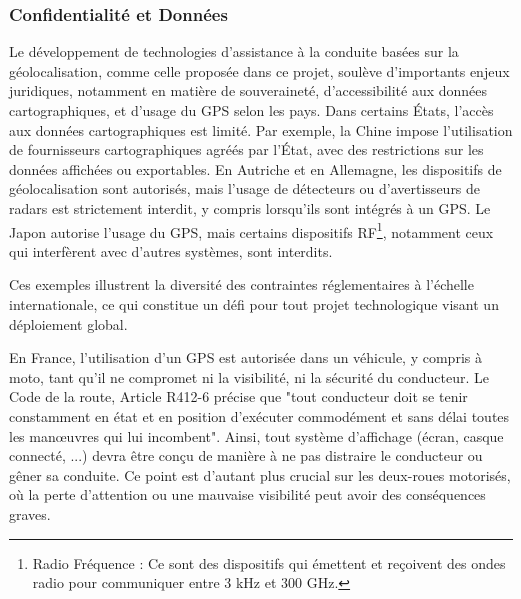 \subsubsection{Confidentialité et Données}
Le développement de technologies d’assistance à la conduite basées sur la géolocalisation, comme celle proposée dans ce projet, soulève d’importants enjeux juridiques, notamment en matière de souveraineté, d’accessibilité aux données cartographiques, et d’usage du GPS selon les pays.
Dans certains États, l’accès aux données cartographiques est limité. Par exemple, la Chine impose l’utilisation de fournisseurs cartographiques agréés par l’État, avec des restrictions sur les données affichées ou exportables. En Autriche et en Allemagne, les dispositifs de géolocalisation sont autorisés, mais l’usage de détecteurs ou d'avertisseurs de radars est strictement interdit, y compris lorsqu'ils sont intégrés à un GPS. Le Japon autorise l’usage du GPS, mais certains dispositifs RF\footnote{Radio Fréquence : Ce sont des dispositifs qui émettent et reçoivent des ondes radio pour communiquer entre 3 kHz et 300 GHz.}, notamment ceux qui interfèrent avec d'autres systèmes, sont interdits.

Ces exemples illustrent la diversité des contraintes réglementaires à l’échelle internationale, ce qui constitue un défi pour tout projet technologique visant un déploiement global.
\vspace{0.5cm}

En France, l'utilisation d’un GPS est autorisée dans un véhicule, y compris à moto, tant qu’il ne compromet ni la visibilité, ni la sécurité du conducteur. Le Code de la route, Article R412-6\cite{loi_code_de_la_route} précise que "tout conducteur doit se tenir constamment en état et en position d'exécuter commodément et sans délai toutes les manœuvres qui lui incombent".
Ainsi, tout système d’affichage (écran, casque connecté, ...) devra être conçu de manière à ne pas distraire le conducteur ou gêner sa conduite. Ce point est d’autant plus crucial sur les deux-roues motorisés, où la perte d’attention ou une mauvaise visibilité peut avoir des conséquences graves.
\vspace{0.5cm}

